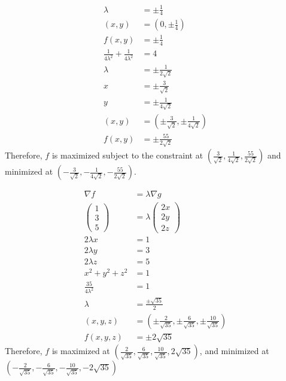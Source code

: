 \documentclass[10pt]{extarticle}
\begin{document}
\begin{problem}{15.3}
\begin{description}[font=\normalfont]
\begin{align*}
          \lambda &= \pm \frac{1}{4}\\
          (x,y) &= \left(0,\pm \frac{1}{4}\right)\\
          f(x,y) &= \pm\frac{1}{4}\\
          \frac{1}{4\lambda^2} + \frac{1}{4\lambda^2} &= 4\tag*{$x = 6\lambda$}\\
          \lambda &= \pm\frac{1}{2\sqrt{2}}\\
          x &= \pm\frac{3}{\sqrt{2}}\\
          y &= \pm \frac{1}{4\sqrt{2}}\\
          (x,y) &= \left(\pm \frac{3}{\sqrt{2}},\pm\frac{1}{4\sqrt{2}}\right)\\
          f(x,y) &= \pm\frac{55}{2\sqrt{2}}
        \end{align*}
        Therefore, $f$ is maximized subject to the constraint at $\left(\frac{3}{\sqrt{2}},\frac{1}{4\sqrt{2}},\frac{55}{2\sqrt{2}}\right)$ and minimized at $\left(-\frac{3}{\sqrt{2}},-\frac{1}{4\sqrt{2}},-\frac{55}{2\sqrt{2}}\right)$.
      \item[10:]
        \begin{align*}
          \nabla f &= \lambda \nabla g\\
          \begin{pmatrix}1\\3\\5\end{pmatrix} &= \lambda \begin{pmatrix}2x\\2y\\2z\end{pmatrix}\\
          2\lambda x &= 1\\
          2\lambda y &= 3\\
          2\lambda z &= 5\\
          x^2 + y^2 + z^2 &= 1\\
          \frac{35}{4\lambda^2} &= 1\\
          \lambda &= \frac{\pm\sqrt{35}}{2}\\
          (x,y,z) &= \left(\pm\frac{2}{\sqrt{35}},\pm\frac{6}{\sqrt{35}},\pm\frac{10}{\sqrt{35}}\right)\\
          f(x,y,z) &= \pm2\sqrt{35}
        \end{align*}
        Therefore, $f$ is maximized at $\left(\frac{2}{\sqrt{35}},\frac{6}{\sqrt{35}},\frac{10}{\sqrt{35}},2\sqrt{35}\right)$, and minimized at $\left(-\frac{2}{\sqrt{35}},-\frac{6}{\sqrt{35}},-\frac{10}{\sqrt{35}},-2\sqrt{35}\right)$

\end{description}
\end{problem}
\end{document}
